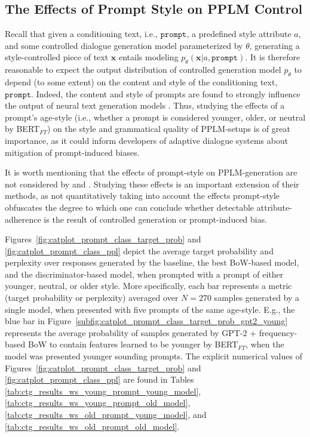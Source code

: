 \subsection{The Effects of Prompt Style on PPLM Control}
\label{subsec:ctg_anal_prompt_class}

Recall that given a conditioning text, i.e., $\texttt{prompt}$, a predefined style attribute $a$, and some controlled dialogue generation model parameterized by $\theta$, generating a style-controlled piece of text $\textbf{x}$ entails modeling $p_{\theta}(\textbf{x} | a, \texttt{prompt})$. It is therefore reasonable to expect the output distribution of controlled generation model $p_{\theta}$ to depend (to some extent) on the content and style of the conditioning text, $\texttt{prompt}$. Indeed, the content and style of prompts are found to strongly influence the output of neural text generation models \citep{fan-etal-2018-hierarchical, lester2021power}. Thus, studying the effects of a prompt's age-style (i.e., whether a prompt is considered younger, older, or neutral by BERT$_{FT}$) on the style and grammatical quality of PPLM-setups is of great importance, as it could inform developers of adaptive dialogue systems about mitigation of prompt-induced biases.

It is worth mentioning that the effects of prompt-style on PPLM-generation are not considered by \cite{dathathri2019plug} and \cite{madotto-etal-2020-plug}. Studying these effects is an important extension of their methods, as not quantitatively taking into account the effects prompt-style obfuscates the degree to which one can conclude whether detectable attribute-adherence is the result of controlled generation or prompt-induced bias.

Figures~\ref{fig:catplot_prompt_class_target_prob} and \ref{fig:catplot_prompt_class_ppl} depict the average target probability and perplexity over responses generated by the baseline, the best BoW-based model, and the discriminator-based model, when prompted with a prompt of either younger, neutral, or older style. More specifically, each bar represents a metric (target probability or perplexity) averaged over $N=270$ samples generated by a single model, when presented with five prompts of the same age-style. E.g., the blue bar in Figure~\ref{subfig:catplot_prompt_class_target_prob_gpt2_young} represents the average probability of samples generated by GPT-2 + frequency-based BoW to contain features learned to be younger by BERT$_{FT}$, when the model was presented younger sounding prompts. The explicit numerical values of Figures~\ref{fig:catplot_prompt_class_target_prob} and \ref{fig:catplot_prompt_class_ppl} are found in Tables \ref{tab:ctg_results_ws_young_prompt_young_model}, \ref{tab:ctg_results_ws_young_prompt_old_model}, \ref{tab:ctg_results_ws_old_prompt_young_model}, and \ref{tab:ctg_results_ws_old_prompt_old_model}.


